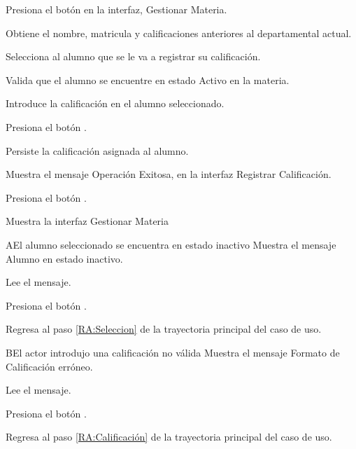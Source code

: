 \begin{UCtrayectoria}
	
	\UCpaso[\UCactor] Presiona el botón  en la interfaz, Gestionar Materia.
	
	\UCpaso[\UCsist] Obtiene el nombre, matricula y calificaciones anteriores al departamental actual.
	
	\UCpaso[\UCactor] \label{RA:Seleccion} Selecciona al alumno que se le va a registrar su calificación.

	\UCpaso[\UCsist] Valida que el alumno se encuentre en estado Activo en la materia. 
	
	\UCpaso[\UCactor] \label{RA:Calificación} Introduce la calificación en el alumno seleccionado. 
	
	\UCpaso[\UCactor] Presiona el botón . 
	
	\UCpaso[\UCsist] Persiste la calificación asignada al alumno.
	
	\UCpaso[\UCsist] Muestra el mensaje Operación Exitosa, en la interfaz Registrar Calificación.
	
	\UCpaso[\UCactor] Presiona el botón . 
	
	\UCpaso[\UCsist] Muestra la interfaz Gestionar Materia
	
\end{UCtrayectoria}


\begin{UCtrayectoriaA}{A}{El alumno seleccionado se encuentra en estado inactivo}
	\UCpaso[\UCsist] Muestra el mensaje Alumno en estado inactivo.
	
	\UCpaso[\UCactor] Lee el mensaje.
	
	\UCpaso[\UCactor] Presiona el botón .

	\UCpaso[\UCsist] Regresa al paso \ref{RA:Seleccion} de la trayectoria principal del caso de uso.
	
\end{UCtrayectoriaA}

\begin{UCtrayectoriaA}{B}{El actor introdujo una calificación no válida}
	\UCpaso[\UCsist] Muestra el mensaje Formato de Calificación erróneo.
	
	\UCpaso[\UCactor] Lee el mensaje.
	
	\UCpaso[\UCactor] Presiona el botón .
	
	\UCpaso[\UCsist] Regresa al paso \ref{RA:Calificación} de la trayectoria principal del caso de uso.
	
\end{UCtrayectoriaA}